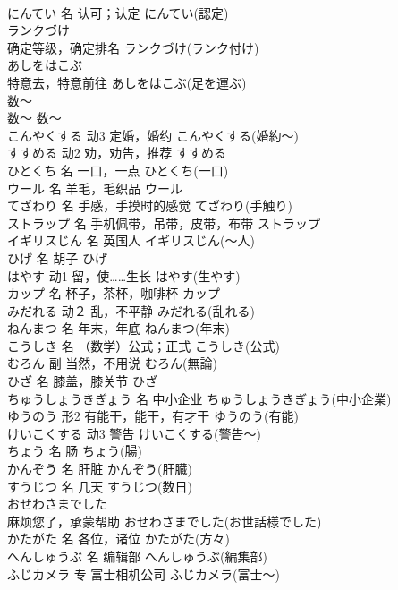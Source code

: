 \documentclass[8pt]{extreport}
\begin{document}
\begin{CJK}{UTF8}{min}
\\	にんてい	名	认可；认定	にんてい(認定)	
\\	ランクづけ	
\\	确定等级，确定排名	ランクづけ(ランク付け)	
\\	あしをはこぶ	
\\	特意去，特意前往	あしをはこぶ(足を運ぶ)	
\\	数～	
\\	数～	数～	
\\	こんやくする	动3	定婚，婚约	こんやくする(婚約～)	
\\	すすめる	动2	劝，劝告，推荐	すすめる	
\\	ひとくち	名	一口，一点	ひとくち(一口)	
\\	ウール	名	羊毛，毛织品	ウール	
\\	てざわり	名	手感，手摸时的感觉	てざわり(手触り)	
\\	ストラップ	名	手机佩带，吊带，皮带，布带	ストラップ	
\\	イギリスじん	名	英国人	イギリスじん(～人)	
\\	ひげ	名	胡子	ひげ	
\\	はやす	动1	留，使……生长	はやす(生やす)	
\\	カップ	名	杯子，茶杯，咖啡杯	カップ	
\\	みだれる	动２	乱，不平静	みだれる(乱れる)	
\\	ねんまつ	名	年末，年底	ねんまつ(年末)	
\\	こうしき	名	（数学）公式；正式	こうしき(公式)	
\\	むろん	副	当然，不用说	むろん(無論)	
\\	ひざ	名	膝盖，膝关节	ひざ	
\\	ちゅうしょうきぎょう	名	中小企业	ちゅうしょうきぎょう(中小企業)	
\\	ゆうのう	形2	有能干，能干，有才干	ゆうのう(有能)	
\\	けいこくする	动3	警告	けいこくする(警告～)	
\\	ちょう	名	肠	ちょう(腸)	
\\	かんぞう	名	肝脏	かんぞう(肝臓)	
\\	すうじつ	名	几天	すうじつ(数日)	
\\	おせわさまでした	
\\	麻烦您了，承蒙帮助	おせわさまでした(お世話様でした)	
\\	かたがた	名	各位，诸位	かたがた(方々)	
\\	へんしゅうぶ	名	编辑部	へんしゅうぶ(編集部)	
\\	ふじカメラ	专	富士相机公司	ふじカメラ(富士～)	

\end{CJK}
\end{document}
